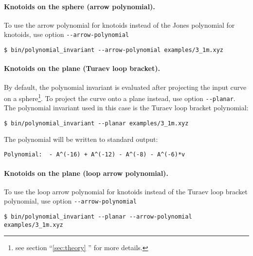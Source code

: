\paragraph{Knotoids on the sphere (arrow polynomial).}
To use the arrow polynomial\cite{guka,dye2009} for knotoids instead of the Jones polynomial for knotoids, use option \lstinline{--arrow-polynomial}
\begin{lstlisting}
$ bin/polynomial_invariant --arrow-polynomial examples/3_1m.xyz
\end{lstlisting}


\paragraph{Knotoids on the plane (Turaev loop bracket).}
By default, the polynomial invariant is evaluated after projecting the input curve on a sphere\footnote{see section ``\ref{sec:theory} '' for more details.}. To project the curve onto a plane instead, use option \lstinline{--planar}. The polynomial invariant used in this case is the Turaev loop bracket polynomial:
\begin{lstlisting}
$ bin/polynomial_invariant --planar examples/3_1m.xyz
\end{lstlisting}
The polynomial will be written to standard output:
\begin{lstlisting}
Polynomial:  - A^(-16) + A^(-12) - A^(-8) - A^(-6)*v
\end{lstlisting}

\paragraph{Knotoids on the plane (loop arrow polynomial).}
To use the loop arrow polynomial\cite{gound2} for knotoids instead of the Turaev loop bracket polynomial, use option \lstinline{--arrow-polynomial}
\begin{lstlisting}
$ bin/polynomial_invariant --planar --arrow-polynomial examples/3_1m.xyz
\end{lstlisting}

